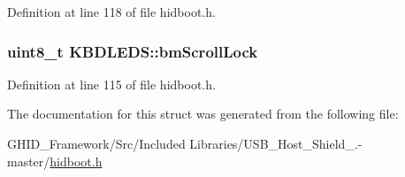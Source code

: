 \-Definition at line 118 of file hidboot.\-h.

\hypertarget{struct_k_b_d_l_e_d_s_adf2e5ff049894e40b0fab7d830f3c393}{
\subsubsection[{bm\-Scroll\-Lock}]{\setlength{\rightskip}{0pt plus 5cm}uint8\-\_\-t {\bf \-K\-B\-D\-L\-E\-D\-S\-::bm\-Scroll\-Lock}}}\label{struct_k_b_d_l_e_d_s_adf2e5ff049894e40b0fab7d830f3c393}


\-Definition at line 115 of file hidboot.\-h.



\-The documentation for this struct was generated from the following file\-:\begin{DoxyCompactItemize}
\item 
\-G\-H\-I\-D\-\_\-\-Framework/\-Src/\-Included Libraries/\-U\-S\-B\-\_\-\-Host\-\_\-\-Shield\-\_.-\/master/\hyperlink{hidboot_8h}{hidboot.\-h}\end{DoxyCompactItemize}
